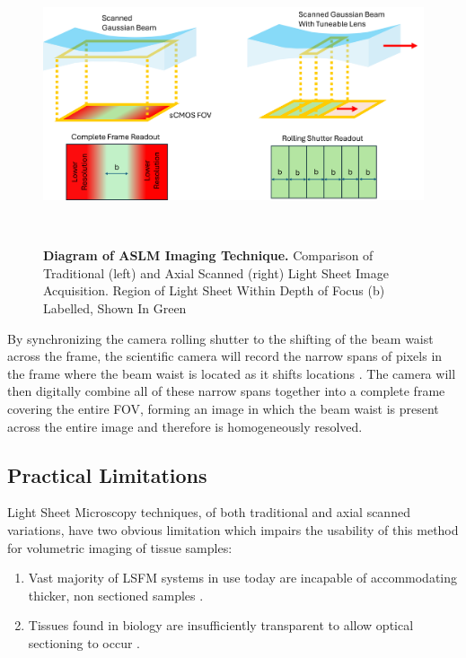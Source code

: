 \begin{figure}[H]
    \centering
    \includegraphics[width=0.85\linewidth]{Figures/ASLMDiagram.png}
    \caption{\textbf{Diagram of ASLM Imaging Technique.} Comparison of Traditional (left) and Axial Scanned (right) Light Sheet Image Acquisition. Region of Light Sheet Within Depth of Focus (b) Labelled, Shown In Green}
    \label{fig:aslm}\
\end{figure}

By synchronizing the camera rolling shutter to the shifting of the beam waist across the frame, the scientific camera will record the narrow spans of pixels in the frame where the beam waist is located as it shifts locations \cite{voigt_mesospim_2019}. The camera will then digitally combine all of these narrow spans together into a complete frame covering the entire FOV, forming an image in which the beam waist is present across the entire image and therefore is homogeneously resolved. 

\subsection{Practical Limitations}

Light Sheet Microscopy techniques, of both traditional and axial scanned variations, have two obvious limitation which impairs the usability of this method for volumetric imaging of tissue samples: 

\begin{enumerate}
    \item Vast majority of LSFM systems in use today are incapable of accommodating thicker, non sectioned samples \cite{poola_light_2019}.
    \item Tissues found in biology are insufficiently transparent to allow optical sectioning to occur \cite{olianti_optical_2021}.
\end{enumerate}

